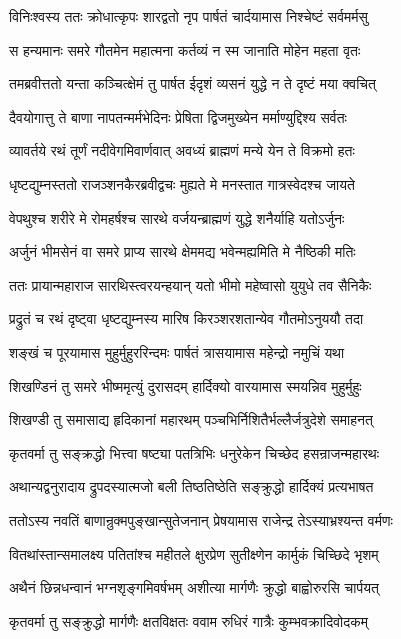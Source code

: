 \twolineshloka
{विनिःश्वस्य ततः क्रोधात्कृपः शारद्वतो नृप}
{पार्षतं चार्दयामास निश्चेष्टं सर्वमर्मसु}


\twolineshloka
{स हन्यमानः समरे गौतमेन महात्मना}
{कर्तव्यं न स्म जानाति मोहेन महता वृतः}


\twolineshloka
{तमब्रवीत्ततो यन्ता कञ्चित्क्षेमं तु पार्षत}
{ईदृशं व्यसनं युद्धे न ते दृष्टं मया क्वचित्}


\twolineshloka
{दैवयोगात्तु ते बाणा नापतन्मर्मभेदिनः}
{प्रेषिता द्विजमुख्येन मर्माण्युद्दिश्य सर्वतः}


\twolineshloka
{व्यावर्तये रथं तूर्णं नदीवेगमिवार्णवात्}
{अवध्यं ब्राह्मणं मन्ये येन ते विक्रमो हतः}


\twolineshloka
{धृष्टद्युम्नस्ततो राजञ्शनकैरब्रवीद्वचः}
{मुह्यते मे मनस्तात गात्रस्वेदश्च जायते}


\twolineshloka
{वेपथुश्च शरीरे मे रोमहर्षश्च सारथे}
{वर्जयन्ब्राह्मणं युद्धे शनैर्याहि यतोऽर्जुनः}


\twolineshloka
{अर्जुनं भीमसेनं वा समरे प्राप्य सारथे}
{क्षेममद्य भवेन्मह्यमिति मे नैष्ठिकी मतिः}


\twolineshloka
{ततः प्रायान्महाराज सारथिस्त्वरयन्हयान्}
{यतो भीमो महेष्वासो युयुधे तव सैनिकैः}


\twolineshloka
{प्रद्रुतं च रथं दृष्ट्वा धृष्टद्युम्नस्य मारिष}
{किरञ्शरशतान्येव गौतमोऽनुययौ तदा}


\twolineshloka
{शङ्खं च पूरयामास मुहुर्मुहुररिन्दमः}
{पार्षतं त्रासयामास महेन्द्रो नमुचिं यथा}


\twolineshloka
{शिखण्डिनं तु समरे भीष्ममृत्युं दुरासदम्}
{हार्दिक्यो वारयामास स्मयन्निव मुहुर्मुहुः}


\twolineshloka
{शिखण्डी तु समासाद्य हृदिकानां महारथम्}
{पञ्चभिर्निशितैर्भल्लैर्जत्रुदेशे समाहनत्}


\twolineshloka
{कृतवर्मा तु सङ्क्रद्धो भित्त्वा षष्ट्या पतत्रिभिः}
{धनुरेकेन चिच्छेद हसन्राजन्महारथः}


\twolineshloka
{अथान्यद्वनुरादाय द्रुपदस्यात्मजो बली}
{तिष्ठतिष्ठेति सङ्क्रुद्धो हार्दिक्यं प्रत्यभाषत}


\twolineshloka
{ततोऽस्य नवतिं बाणान्रुक्मपुङ्खान्सुतेजनान्}
{प्रेषयामास राजेन्द्र तेऽस्याभ्रश्यन्त वर्मणः}


\twolineshloka
{वितथांस्तान्समालक्ष्य पतितांश्च महीतले}
{क्षुरप्रेण सुतीक्ष्णेन कार्मुकं चिच्छिदे भृशम्}


\twolineshloka
{अथैनं छिन्नधन्वानं भग्नशृङ्गमिवर्षभम्}
{अशीत्या मार्गणैः क्रुद्धो बाह्वोरुरसि चार्पयत्}


\twolineshloka
{कृतवर्मा तु सङ्क्रुद्धो मार्गणैः क्षतविक्षतः}
{ववाम रुधिरं गात्रैः कुम्भवक्रादिवोदकम्}


